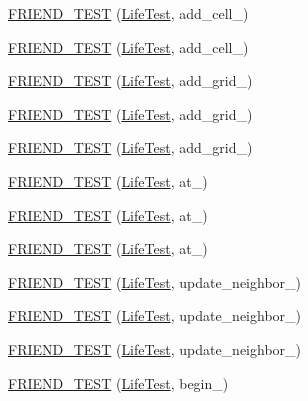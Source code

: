 \begin{DoxyCompactItemize}
\item 
\hyperlink{classLife_a8d7664b739641f701b78fadcfd1921e6}{F\-R\-I\-E\-N\-D\-\_\-\-T\-E\-S\-T} (\hyperlink{classLife_ac09a12090bbd959da33d05c9c8bfa744}{Life\-Test}, add\-\_\-cell\-\_)
\item 
\hyperlink{classLife_a0ed3cd225c3e06e1451f2abbbc370a74}{F\-R\-I\-E\-N\-D\-\_\-\-T\-E\-S\-T} (\hyperlink{classLife_ac09a12090bbd959da33d05c9c8bfa744}{Life\-Test}, add\-\_\-cell\-\_)
\item 
\hyperlink{classLife_a8a7b07a6040a7880ea95b7c129ffd839}{F\-R\-I\-E\-N\-D\-\_\-\-T\-E\-S\-T} (\hyperlink{classLife_ac09a12090bbd959da33d05c9c8bfa744}{Life\-Test}, add\-\_\-grid\-\_)
\item 
\hyperlink{classLife_af40f868feac88a90732fb186f3c1e528}{F\-R\-I\-E\-N\-D\-\_\-\-T\-E\-S\-T} (\hyperlink{classLife_ac09a12090bbd959da33d05c9c8bfa744}{Life\-Test}, add\-\_\-grid\-\_)
\item 
\hyperlink{classLife_a1696b5a832fea3161d31b9a7bb0beddc}{F\-R\-I\-E\-N\-D\-\_\-\-T\-E\-S\-T} (\hyperlink{classLife_ac09a12090bbd959da33d05c9c8bfa744}{Life\-Test}, add\-\_\-grid\-\_)
\item 
\hyperlink{classLife_a3748cd132bb5b108645ddd1757e2a04e}{F\-R\-I\-E\-N\-D\-\_\-\-T\-E\-S\-T} (\hyperlink{classLife_ac09a12090bbd959da33d05c9c8bfa744}{Life\-Test}, at\-\_)
\item 
\hyperlink{classLife_a4eee3731d38f693f1c9c2c27eb8da18d}{F\-R\-I\-E\-N\-D\-\_\-\-T\-E\-S\-T} (\hyperlink{classLife_ac09a12090bbd959da33d05c9c8bfa744}{Life\-Test}, at\-\_)
\item 
\hyperlink{classLife_ac92c92eca26318c0e3e63ffa8b082d64}{F\-R\-I\-E\-N\-D\-\_\-\-T\-E\-S\-T} (\hyperlink{classLife_ac09a12090bbd959da33d05c9c8bfa744}{Life\-Test}, at\-\_)
\item 
\hyperlink{classLife_a98d2a9cfbe0897183aa7fc5949824923}{F\-R\-I\-E\-N\-D\-\_\-\-T\-E\-S\-T} (\hyperlink{classLife_ac09a12090bbd959da33d05c9c8bfa744}{Life\-Test}, update\-\_\-neighbor\-\_)
\item 
\hyperlink{classLife_a8df28a050110cc65e98c796aa979b059}{F\-R\-I\-E\-N\-D\-\_\-\-T\-E\-S\-T} (\hyperlink{classLife_ac09a12090bbd959da33d05c9c8bfa744}{Life\-Test}, update\-\_\-neighbor\-\_)
\item 
\hyperlink{classLife_a966fd771dc0f8f88ad74bdd0f7ce878a}{F\-R\-I\-E\-N\-D\-\_\-\-T\-E\-S\-T} (\hyperlink{classLife_ac09a12090bbd959da33d05c9c8bfa744}{Life\-Test}, update\-\_\-neighbor\-\_)
\item 
\hyperlink{classLife_ad4a389524e5eb7f1526358a280a6f535}{F\-R\-I\-E\-N\-D\-\_\-\-T\-E\-S\-T} (\hyperlink{classLife_ac09a12090bbd959da33d05c9c8bfa744}{Life\-Test}, begin\-\_)

\end{DoxyCompactItemize}
